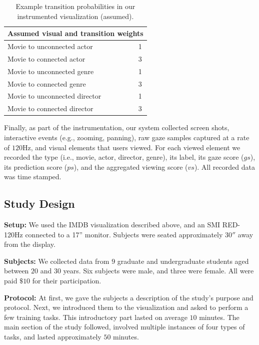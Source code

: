 \begin{table}[htbp]
\caption{Example transition probabilities in our instrumented visualization (assumed).}
	\centering
		\begin{tabular}{|l|c|}
			\hline
			 \multicolumn{2}{|c|}{Assumed visual and transition weights} \\ \hline
			Movie to unconnected actor & 1\\\hline
			Movie to connected actor & 3\\\hline
			Movie to unconnected genre & 1\\\hline
			Movie to connected genre & 3\\\hline
			Movie to unconnected director & 1\\\hline
			Movie to connected director & 3\\\hline			
		\end{tabular}
	
	\label{tab:Transition2}
\end{table}

Finally, as part of the instrumentation, our system collected screen shots, interactive events (e.g., zooming, panning), raw gaze samples captured at a rate of $120$Hz, and visual elements that users viewed. For each viewed element we recorded the type (i.e., movie, actor, director, genre), its label, its gaze score ($gs$), its prediction score ($ps$), and the aggregated viewing score ($vs$). All recorded data was time stamped.

\subsection{Study Design}
\label{sec:EvalStudyDesign}

\noindent\textbf{Setup: } We used the IMDB visualization described above, and an SMI RED-120Hz connected to a 17'' monitor. Subjects were seated approximately $30''$ away from the display. 

\noindent\textbf{Subjects:} We collected data from $9$ graduate and undergraduate students aged between $20$ and $30$ years. Six subjects were male, and three were female. All were paid $\$10$ for their participation. 

\noindent\textbf{Protocol:} At first, we gave the subjects a description of the study's purpose and protocol. Next, we introduced them to the visualization and asked to perform a few training tasks. This introductory part lasted on average $10$ minutes. The main section of the study followed, involved multiple instances of four types of tasks, and lasted approximately $50$ minutes. 

